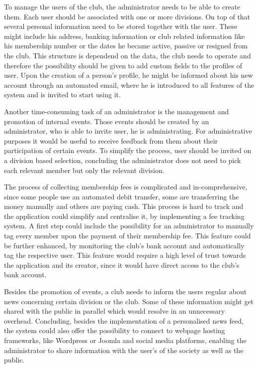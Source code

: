 To manage the users of the club, the administrator needs to be able to create them. Each user should be associated with one or more divisions. On top of that several personal information need to be stored together with the user. These might include his address, banking information or club related information like his membership number or the dates he became active, passive or resigned from the club. This structure is dependend on the data, the club needs to operate and therefore the possibility should be given to add custom fields to the profiles of user. Upon the creation of a person's profile, he might be informed about his new account through an automated email, where he is introduced to all features of the system and is invited to start using it.

Another time-consuming task of an administrator is the management and promotion of internal events. Those events should be created by an administrator, who is able to invite user, he is administrating. For administrative purposes it would be useful to receive feedback from them about their participation of certain events. To simplify the process, user should be invited on a division based selection, concluding the administrator does not need to pick each relevant member but only the relevant division.

The process of collecting membership fees is complicated and in-comprehensive, since some people use an automated debit transfer, some are transferring the money manually and others are paying cash. This process is hard to track and the application could simplify and centralise it, by implementing a fee tracking system. A first step could include the possibility for an administrator to manually tag every member upon the payment of their membership fee. This feature could be further enhanced, by monitoring the club's bank account and automatically tag the respective user. This feature would require a high level of trust towards the application and its creator, since it would have direct access to the club's bank account.

Besides the promotion of events, a club needs to inform the users regular about news concerning certain division or the club. Some of these information might get shared with the public in parallel which would resolve in an unnecessary overhead. Concluding, besides the implementation of a personalised news feed, the system could also offer the possibility to connect to webpage hosting frameworks, like Wordpress or Joomla and social media platforms, enabling the administrator to share information with the user's of the society as well as the public.

